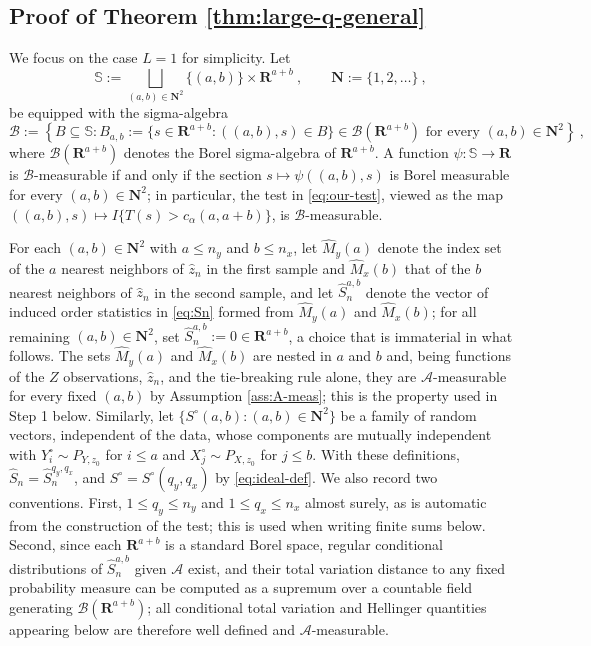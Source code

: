 \documentclass[11pt]{article}
\numberwithin{equation}{section}
\begin{document}
\subsection{Proof of Theorem \ref{thm:large-q-general}}
We focus on the case $L=1$ for simplicity. Let
\begin{equation*}
 \mathbb S:=\bigsqcup_{(a,b)\in\mathbf N^2}\{(a,b)\}\times\mathbf R^{a+b}~,
 \qquad \mathbf N:=\{1,2,\dots\}~,
\end{equation*}
be equipped with the sigma-algebra
\begin{equation*}
 \mathcal B:=\left\{B\subseteq\mathbb S: B_{a,b}:=\{s\in\mathbf R^{a+b}:((a,b),s)\in B\}\in\mathcal B(\mathbf R^{a+b})
 \text{ for every }(a,b)\in\mathbf N^2\right\}~,
\end{equation*}
where $\mathcal B(\mathbf R^{a+b})$ denotes the Borel sigma-algebra of $\mathbf R^{a+b}$. A function
$\psi:\mathbb S\to\mathbf R$ is $\mathcal B$-measurable if and only if the section $s\mapsto\psi((a,b),s)$ is
Borel measurable for every $(a,b)\in\mathbf N^2$; in particular, the test in \eqref{eq:our-test},
viewed as the map $((a,b),s)\mapsto I\{T(s)>c_\alpha(a,a+b)\}$, is $\mathcal B$-measurable.

For each $(a,b)\in\mathbf N^2$ with $a\le n_y$ and $b\le n_x$, let $\hat M_y(a)$ denote the index set
of the $a$ nearest neighbors of $\hat z_n$ in the first sample and $\hat M_x(b)$ that of the $b$
nearest neighbors of $\hat z_n$ in the second sample, and let $\hat S_n^{a,b}$ denote the vector of
induced order statistics in \eqref{eq:Sn} formed from $\hat M_y(a)$ and $\hat M_x(b)$; for
all remaining $(a,b)\in\mathbf N^2$, set $\hat S_n^{a,b}:=0\in\mathbf R^{a+b}$, a choice that is immaterial in
what follows. The sets $\hat M_y(a)$ and $\hat M_x(b)$ are nested in $a$ and $b$ and, being
functions of the $Z$ observations, $\hat z_n$, and the tie-breaking rule alone, they are
$\mathcal A$-measurable for every fixed $(a,b)$ by Assumption \ref{ass:A-meas}; this is the property
used in Step 1 below. Similarly, let $\{S^{\circ}(a,b):(a,b)\in\mathbf N^2\}$ be a family of random
vectors, independent of the data, whose components are mutually independent with
$Y^{\circ}_i\sim P_{Y,z_0}$ for $i\le a$ and $X^{\circ}_j\sim P_{X,z_0}$ for $j\le b$. With
these definitions, $\hat S_n=\hat S_n^{q_y,q_x}$, and $S^{\circ}=S^{\circ}(q_y,q_x)$ by \eqref{eq:ideal-def}. We also
record two conventions. First, $1\le q_y\le n_y$ and $1\le q_x\le n_x$ almost surely, as is
automatic from the construction of the test; this is used when writing finite sums below.
Second, since each $\mathbf R^{a+b}$ is a standard Borel space, regular conditional distributions of
$\hat S_n^{a,b}$ given $\mathcal A$ exist, and their total variation distance to any fixed probability
measure can be computed as a supremum over a countable field generating $\mathcal B(\mathbf R^{a+b})$; all
conditional total variation and Hellinger quantities appearing below are therefore well
defined and $\mathcal A$-measurable.
\end{document}
